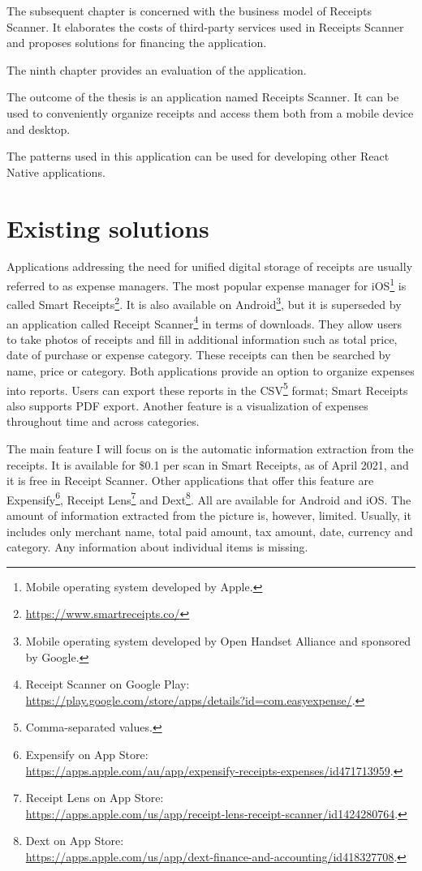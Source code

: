 \documentclass[
  digital, %
  table,   %
  oneside, %
  lof,     %
  lot,     %
]{fithesis3}
\begin{document}
The subsequent chapter is concerned with the business model of Receipts Scanner. It elaborates the costs of third-party services used in Receipts Scanner and proposes solutions for financing the application. 

The ninth chapter provides an evaluation of the application.

The outcome of the thesis is an application named Receipts Scanner. It can be used to conveniently organize receipts and access them both from a mobile device and desktop.

The patterns used in this application can be used for developing other React Native applications.

\chapter{Existing solutions}

Applications addressing the need for unified digital storage of receipts are usually referred to as expense managers. The most popular expense manager for iOS\footnote{Mobile operating system developed by Apple.} is called Smart Receipts\footnote{\url{https://www.smartreceipts.co/}}. It is also available on Android\footnote{ Mobile operating system developed by Open Handset Alliance and sponsored by Google.}, but it is superseded by an application called Receipt Scanner\footnote{Receipt Scanner on Google Play:\\\url{https://play.google.com/store/apps/details?id=com.easyexpense/}.} in terms of downloads. They allow users to take photos of receipts and fill in additional information such as total price, date of purchase or expense category. These receipts can then be searched by name, price or category. Both applications provide an option to organize expenses into reports. Users can export these reports in the CSV\footnote{Comma-separated values.} format; Smart Receipts also supports PDF export. Another feature is a visualization of expenses throughout time and across categories.

The main feature I will focus on is the automatic information extraction from the receipts. It is available for \$0.1 per scan in Smart Receipts, as of April 2021, and it is free in Receipt Scanner. Other applications that offer this feature are Expensify\footnote{Expensify on App Store:\\\url{https://apps.apple.com/au/app/expensify-receipts-expenses/id471713959}.}, Receipt Lens\footnote{Receipt Lens on App Store:\\\url{https://apps.apple.com/us/app/receipt-lens-receipt-scanner/id1424280764}.} and Dext\footnote{Dext on App Store:\\\url{https://apps.apple.com/us/app/dext-finance-and-accounting/id418327708}.}. All are available for Android and iOS. The amount of information extracted from the picture is, however, limited. Usually, it includes only merchant name, total paid amount, tax amount, date, currency and category. Any information about individual items is missing.
\end{document}
